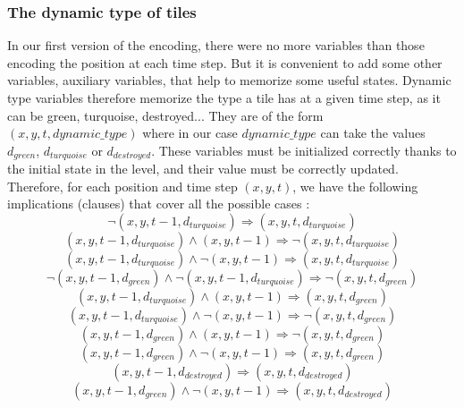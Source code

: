 \documentclass[a4paper, 12pt, titlepage]{article}
\begin{document}
\subsubsection{The dynamic type of tiles}
In our first version of the encoding, there were no more variables than those
encoding the position at each time step. But it is convenient to add some other
variables, auxiliary variables, that help to memorize some useful states.
Dynamic type variables therefore memorize the type a tile has at a given
time step, as it can be green, turquoise, destroyed... They are of the form
$(x, y, t, dynamic\_type)$ where in our case $dynamic\_type$ can take the values
$d_{green}$, $d_{turquoise}$ or $d_{destroyed}$. These variables must be
initialized correctly thanks to the initial state in the level, and their value
must be correctly updated. Therefore, for each position and time step
$(x, y, t)$, we have the following implications (clauses) that cover all the
possible cases :
\begin{equation}
\neg(x, y, t-1, d_{turquoise}) \Rightarrow (x, y, t, d_{turquoise})
\end{equation}
\begin{equation}
(x, y, t-1, d_{turquoise}) \wedge (x, y, t-1) \Rightarrow
					      \neg(x, y, t, d_{turquoise})
\end{equation}
\begin{equation}
(x, y, t-1, d_{turquoise}) \wedge \neg(x, y, t-1) \Rightarrow
						  (x, y, t, d_{turquoise})
\end{equation}
\begin{equation}
\neg(x, y, t-1, d_{green}) \wedge \neg(x, y, t-1, d_{turquoise}) \Rightarrow
							\neg(x, y, t, d_{green})
\end{equation}
\begin{equation}
(x, y, t-1, d_{turquoise}) \wedge (x, y, t-1) \Rightarrow (x, y, t, d_{green})
\end{equation}
\begin{equation}
(x, y, t-1, d_{turquoise}) \wedge \neg(x, y, t-1) \Rightarrow
						  \neg(x, y, t, d_{green})
\end{equation}
\begin{equation}
(x, y, t-1, d_{green}) \wedge (x, y, t-1) \Rightarrow \neg(x, y, t, d_{green})
\end{equation}
\begin{equation}
(x, y, t-1, d_{green}) \wedge \neg(x, y, t-1) \Rightarrow (x, y, t, d_{green})
\end{equation}
\begin{equation}
(x, y, t-1, d_{destroyed}) \Rightarrow (x, y, t, d_{destroyed})
\end{equation}
\begin{equation}
(x, y, t-1, d_{green}) \wedge \neg(x, y, t-1) \Rightarrow
					      (x, y, t, d_{destroyed})
\end{equation}
\end{document}
